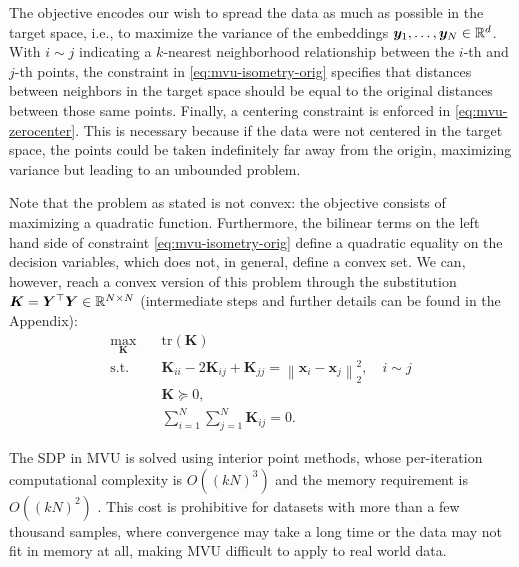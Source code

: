 \documentclass{article} %
\newcommand{\norm}[1]{\left\lVert#1\right\rVert}
\begin{document}
The objective encodes our wish to spread the data as much as possible in the target space, i.e., to maximize the variance of the embeddings $\bm{y}_1,\dotsc,\bm{y}_N\in\mathbb{R}^{d}$. With $i\sim j$ indicating a $k$-nearest neighborhood relationship between the $i$-th and $j$-th points, the constraint in \eqref{eq:mvu-isometry-orig} specifies that distances between neighbors in the target space should be equal to the original distances between those same points. Finally, a centering constraint is enforced in \eqref{eq:mvu-zerocenter}. This is necessary because if the data were not centered in the target space, the points could be taken indefinitely far away from the origin, maximizing variance but leading to an unbounded problem.

Note that the problem as stated is not convex: the objective consists of maximizing a quadratic function. Furthermore, the bilinear terms on the left hand side of constraint \eqref{eq:mvu-isometry-orig} define a quadratic equality on the decision variables, which does not, in general, define a convex set. We can, however, reach a convex version of this problem through the substitution $\bm{K}=\bm{Y}^\top\bm{Y}\in\mathbb{R}^{N\times N}$ (intermediate steps and further details can be found in the Appendix):
\begin{align}
\max_{\bm{K}} \quad & \text{tr}(\bm{K})\\
\textrm{s.t.} \quad & \bm{K}_{ii}-2\bm{K}_{ij}+\bm{K}_{jj}=\norm{\bm{x}_{i}-\bm{x}_{j}}_{2}^{2},\quad i\sim j\label{eq:mvu-isometry-k}\\
\quad & \bm{K} \succeq 0,\label{eq:mvu-sdp-k}\\
\quad & \sum_{i=1}^{N}\sum_{j=1}^{N}\bm{K}_{ij}=0.\label{eq:mvu-sumzero-k}
\end{align}


The SDP in MVU is solved using interior point methods, whose per-iteration computational complexity is $O((kN)^3)$ and the memory requirement is $O((kN)^2)$ \citep{sdp-solve}. This cost is prohibitive for datasets with more than a few thousand samples, where convergence may take a long time or the data may not fit in memory at all, making MVU difficult to apply to real world data.
\end{document}
